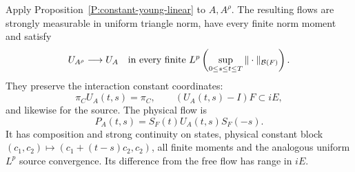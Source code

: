 \begin{proposition}
  \label{P:constant-gaussian-flow}
  Apply Proposition~\ref{P:constant-young-linear} to $A,A^\rho$. The resulting
  flows are strongly measurable in uniform triangle norm, have every finite norm
  moment and satisfy
  \begin{equation}\label{E:constant-flow-limit}
    U_{A^\rho}\longrightarrow U_A
    \quad\hbox{in every finite }L^p
    \left(\sup_{0\le s\le t\le T}\|\cdot\|_{\mathcal{B}(F)}\right).
  \end{equation}
  They preserve the interaction constant coordinates:
  \begin{equation}\label{E:constant-flow-range}
    \pi_CU_A(t,s)=\pi_C,\qquad
    (U_A(t,s)-I)F\subset iE,
  \end{equation}
  and likewise for the source. The physical flow is
  \begin{equation}\label{E:constant-physical-flow}
    P_A(t,s)=S_F(t)U_A(t,s)S_F(-s).
  \end{equation}
  It has composition and strong continuity on states, physical constant block
  $(c_1,c_2)\mapsto(c_1+(t-s)c_2,c_2)$, all finite moments and the analogous
  uniform $L^p$ source convergence. Its difference from the free flow has range
  in $iE$.
\end{proposition}

